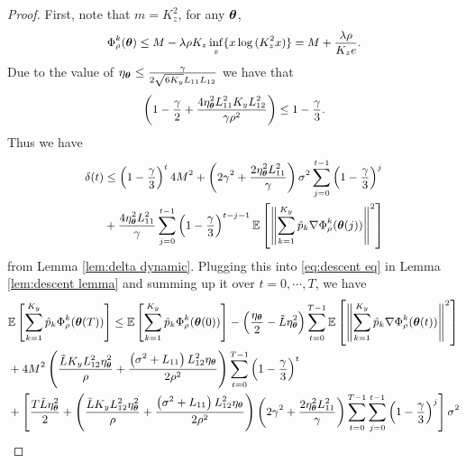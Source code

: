 \begin{proof}
	First, note that $m = K_{z}^{2}$, for any $\text{\boldmath{$\theta$}}$,
	\begin{equation}\label{eq:phi bound}
		\small
		\Phi_{\rho}^{k}(\btheta) \leq M - \lambda\rho K_{z}\inf_{x}\{x\log{(K_{z}^{2}x)}\} = M + \frac{\lambda\rho}{K_{z}e}. 
	\end{equation}
	Due to the value of $\eta_{\text{\boldmath{$\theta$}}}\leq \frac{\gamma}{2\sqrt{6K_{y}}L_{11}L_{12}}$ we have that 
	\begin{equation}
		\small
		\left(1 - \frac{\gamma}{2} + \frac{4\eta_{\btheta}^{2}L_{11}^{2}K_{y}L_{12}^{2}}{\gamma\rho^{2}}\right) \leq 1 - \frac{\gamma}{3}. 
	\end{equation}
	Thus we have 
	\begin{equation}
		\small
		\begin{aligned}
			\delta(t) & \leq \left(1 - \frac{\gamma}{3}\right)^{t}4M^{2} + \left(2\gamma^{2} + \frac{2\eta_{\btheta}^{2}L_{11}^{2}}{\gamma}\right)\sigma^{2}\sum\limits_{j=0}^{t - 1}\left(1 - \frac{\gamma}{3}\right)^{j} \\
			& + \frac{4\eta_{\btheta}^{2}L_{11}^{2}}{\gamma}\sum\limits_{j=0}^{t - 1}\left(1 - \frac{\gamma}{3}\right)^{t - j - 1}\mE\left[\left\|\sum\limits_{k = 1}^{K_{y}}\hat{p}_{k}\nabla\Phi_{\rho}^{k}(\btheta(j))\right\|^{2}\right]
		\end{aligned}
	\end{equation}
	from Lemma \ref{lem:delta dynamic}. Plugging this into \eqref{eq:descent eq} in Lemma \ref{lem:descent lemma} and summing up it over $t=0, \cdots, T$, we have 
	\begin{equation}\label{eq:descent total}
		\small
		\begin{aligned}
			& \mE\left[\sum\limits_{k=1}^{K_{y}}\hat{p}_{k}\Phi_{\rho}^{k}(\btheta(T))\right] \leq \mE\left[\sum\limits_{k=1}^{K_{y}}\hat{p}_{k}\Phi_{\rho}^{k}(\btheta(0))\right] - \left(\frac{\eta_{\btheta}}{2} - \tilde{L}\eta_{\btheta}^{2}\right)\sum\limits_{t=0}^{T - 1}\mE\left[\left\|\sum\limits_{k=1}^{K_{y}}\hat{p}_{k}\nabla\Phi_{\rho}^{k}(\btheta(t))\right\|^{2}\right] \\
			& + 4M^{2}\left(\frac{\tilde{L}K_{y}L_{12}^{2}\eta_{\btheta}^{2}}{\rho} + \frac{\left(\sigma^{2} + L_{11}\right)L_{12}^{2}\eta_{\btheta}}{2\rho^{2}}\right)\sum\limits_{t=0}^{T - 1}\left(1 - \frac{\gamma}{3}\right)^{t} \\
			& + \left[\frac{T\tilde{L}\eta_{\btheta}^{2}}{2} + \left(\frac{\tilde{L}K_{y}L_{12}^{2}\eta_{\btheta}^{2}}{\rho} + \frac{\left(\sigma^{2} + L_{11}\right)L_{12}^{2}\eta_{\btheta}}{2\rho^{2}}\right)\left(2\gamma^{2} + \frac{2\eta_{\btheta}^{2}L_{11}^{2}}{\gamma}\right)\sum\limits_{t=0}^{T - 1}\sum\limits_{j=0}^{t - 1}\left(1 - \frac{\gamma}{3}\right)^{j}\right]\sigma^{2} \\

\end{aligned}
\end{equation}
\end{proof}
